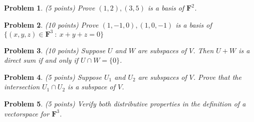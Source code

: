 \documentclass{article}
\theoremstyle{problemstyle}
\newtheorem{problem}{Problem}
\theoremstyle{problemstyle}
\theoremstyle{problemstyle}
\begin{document}
\begin{problem}
(5 points) Prove $(1,2),(3,5)$ is a basis of $\textbf{F}^2$. 
\end{problem}

\begin{problem}
(10 points) Prove $(1,-1,0),(1,0,-1)$ is a basis of $\{(x,y,z) \in \textbf{F}^3 \ : \ x+y+z =0 \}$
\end{problem}

\begin{problem}
(10 points) Suppose $U$ and $W$ are subspaces of $V$. Then $U + W$ is a direct sum if and only if $U\cap W = \{0\}$.
\end{problem}

\begin{problem}
(5 points) Suppose $U_1$ and $U_2$ are subspaces of $V$. Prove that the intersection $U_1 \cap U_2$ is a subspace of $V$. 
\end{problem}

\begin{problem}
(5 points) Verify both distributive properties in the definition of a vectorspace for $\textbf{F}^3$.
\end{problem}
\end{document}
